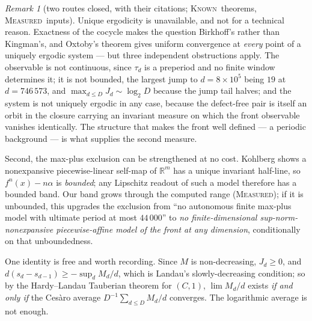 \documentclass[11pt]{article}
\theoremstyle{definition}
\theoremstyle{remark}
\newtheorem{remark}[theorem]{Remark}
\newcommand{\MEASURED}{\textsc{Measured}}
\newcommand{\KNOWN}{\textsc{Known}}
\begin{document}
\begin{remark}[two routes closed, with their citations; \KNOWN\ theorems, \MEASURED\ inputs]\label{fr:closed2}
Unique ergodicity is unavailable, and not for a technical reason. Exactness of the cocycle makes the
question Birkhoff's rather than Kingman's, and Oxtoby's theorem gives uniform convergence at
\emph{every} point of a uniquely ergodic system --- but three independent obstructions apply. The
observable is not continuous, since $\tau_d$ is a preperiod and no finite window determines it; it is
not bounded, the largest jump to $d=8\times10^{5}$ being $19$ at $d=746\,573$, and
$\max_{d\le D}J_d\sim\log_2D$ because the jump tail halves; and the system is not uniquely ergodic in
any case, because the defect-free pair is itself an orbit in the closure carrying an invariant measure
on which the front observable vanishes identically. The structure that makes the front well defined ---
a periodic background --- is what supplies the second measure.

Second, the max-plus exclusion can be strengthened at no cost. Kohlberg \cite{Kohlberg} shows a
nonexpansive piecewise-linear self-map of $\mathbb R^m$ has a unique invariant half-line, so $f^n(x)-n\alpha$
is \emph{bounded}; any Lipschitz readout of such a model therefore has a bounded band. Our band grows through the computed range (\MEASURED); if it is unbounded, this upgrades the exclusion from ``no autonomous finite max-plus model with
ultimate period at most $44\,000$'' to \emph{no finite-dimensional sup-norm-nonexpansive
piecewise-affine model of the front at any dimension}, conditionally on that unboundedness.

One identity is free and worth recording. Since $M$ is non-decreasing, $J_d\ge0$, and
$d(s_d-s_{d-1})\ge-\sup_dM_d/d$, which is Landau's slowly-decreasing condition; so by the
Hardy--Landau Tauberian theorem for $(C,1)$, $\lim M_d/d$ exists \emph{if and only if} the Ces\`aro
average $D^{-1}\sum_{d\le D}M_d/d$ converges. The logarithmic average is not enough.
\end{remark}
\end{document}

